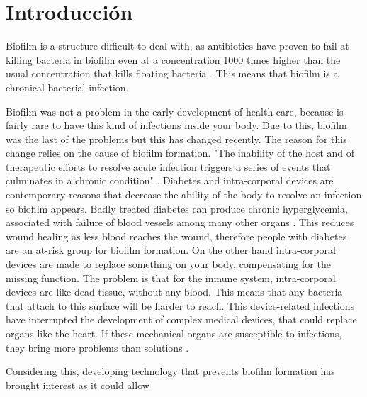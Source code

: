\chapter{Introducción}

Biofilm is a structure difficult to deal with, as antibiotics have proven to fail at killing bacteria in biofilm even at a concentration 1000 times higher than the usual concentration that kills floating bacteria \cite{introduction to biofilm}. This means that biofilm is a chronical bacterial infection.

Biofilm was not a problem in the early development of health care, because is fairly rare to have this kind of infections inside your body. Due to this, biofilm was the last of the problems but this has changed recently. The reason for this change relies on the cause of biofilm formation. "The inability of the host and of therapeutic efforts to resolve acute infection triggers a series of events that culminates in a chronic condition" \cite{treatment of chronic infection}. Diabetes and intra-corporal devices are contemporary reasons that decrease the ability of the body to resolve an infection so biofilm appears. Badly treated diabetes can produce chronic hyperglycemia, associated with failure of blood vessels among many other organs \cite{diagnosis and classification of diabetes mellitus}. This reduces wound healing as less blood reaches the wound, therefore people with diabetes are an at-risk group for biofilm formation. On the other hand intra-corporal devices are made to replace something on your body, compensating for the missing function. The problem is that for the inmune system, intra-corporal devices are like dead tissue, without any blood. This means that any bacteria that attach to this surface will be harder to reach. This device-related infections have interrupted the development of complex medical devices, that could replace organs like the heart. If these mechanical organs are susceptible to infections, they bring more problems than solutions \cite{introduction to biofilm}.

Considering this, developing technology that prevents biofilm formation has brought interest as it could allow 
